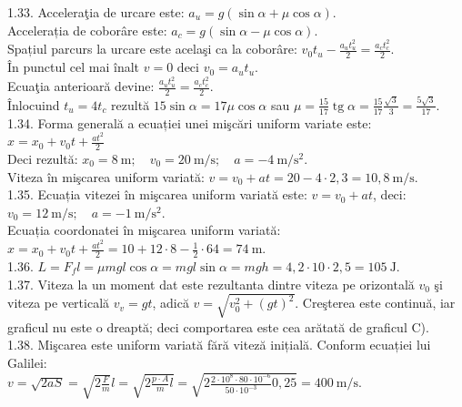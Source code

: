 1.33. Acceleraţia de urcare este: $a_{u}=g(\sin \alpha+\mu \cos \alpha)$.\\ Accelerația de coborâre este: $a_{c}=g(\sin \alpha-\mu \cos \alpha)$.\\ Spațiul parcurs la urcare este acelaşi ca la coborâre: $v_{0} t_{u}-\frac{a_{u} t_{u}^{2}}{2}=\frac{a_{c} t_{c}^{2}}{2}$.\\ În punctul cel mai înalt $v=0$ deci $v_{0}=a_{u} t_{u}$.\\ Ecuaţia anterioară devine: $\frac{a_{u} t_{u}^{2}}{2}=\frac{a_{c} t_{c}^{2}}{2}$.\\ Înlocuind $t_{u}=4 t_{c}$ rezultă $15 \sin \alpha=17 \mu \cos \alpha$ sau $\mu=\frac{15}{17} \operatorname{tg} \alpha=\frac{15}{17} \frac{\sqrt{3}}{3}=\frac{5 \sqrt{3}}{17}$.\\

1.34. Forma generală a ecuației unei mişcări uniform variate este:\\ $x=x_{0}+v_{0} t+\frac{a t^{2}}{2}$\\ Deci rezultă: $x_{0}=8 \mathrm{~m}; \quad v_{0}=20 \mathrm{~m} / \mathrm{s}; \quad a=-4 \mathrm{~m} / \mathrm{s}^{2}$.\\ Viteza în mişcarea uniform variată: $v=v_{0}+a t=20-4 \cdot 2,3=10,8 \mathrm{~m} / \mathrm{s}$.\\

1.35. Ecuația vitezei în mişcarea uniform variată este: $v=v_{0}+a t$, deci:\\ $v_{0}=12 \mathrm{~m} / \mathrm{s}; \quad a=-1 \mathrm{~m} / \mathrm{s}^{2}$.\\ Ecuația coordonatei în mişcarea uniform variată:\\ $x=x_{0}+v_{0} t+\frac{a t^{2}}{2}=10+12 \cdot 8-\frac{1}{2} \cdot 64=74 \mathrm{~m}$.\\

1.36. $L=F_{f} l=\mu m g l \cos \alpha=m g l \sin \alpha=m g h=4,2 \cdot 10 \cdot 2,5=105 \mathrm{~J}$.\\

1.37. Viteza la un moment dat este rezultanta dintre viteza pe orizontală $v_{0}$ şi viteza pe verticală $v_{v}=g t$, adică $v=\sqrt{v_{0}^{2}+(g t)^{2}}$. Creşterea este continuă, iar graficul nu este o dreaptă; deci comportarea este cea arătată de graficul C).\\

1.38. Mişcarea este uniform variată fără viteză inițială. Conform ecuației lui Galilei:\\ $v=\sqrt{2 a S}=\sqrt{2 \frac{F}{m}} l=\sqrt{2 \frac{p \cdot A}{m} l}=\sqrt{2 \frac{2 \cdot 10^{8} \cdot 80 \cdot 10^{-6}}{50 \cdot 10^{-3}} 0,25}=400 \mathrm{~m} / \mathrm{s}$.\\

